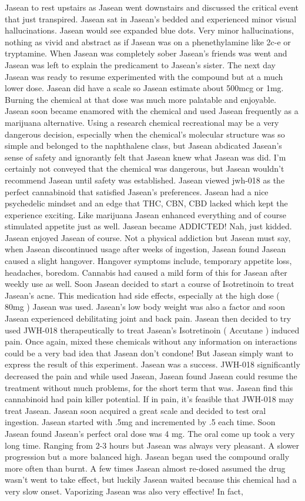 \documentclass[12pt]{book}
\begin{document}
Jasean to rest upstairs as Jasean went downstairs and discussed the critical event that just transpired. Jasean sat in Jasean's bedded and experienced minor visual hallucinations. Jasean would see expanded blue dots. Very minor hallucinations, nothing as vivid and abstract as if Jasean was on a phenethylamine like 2c-e or tryptamine. When Jasean was completely sober Jasean's friends was went and Jasean was left to explain the predicament to Jasean's sister. The next day Jasean was ready to resume experimented with the compound but at a much lower dose. Jasean did have a scale so Jasean estimate about 500mcg or 1mg. Burning the chemical at that dose was much more palatable and enjoyable. Jasean soon became enamored with the chemical and used Jasean frequently as a marijuana alternative. Using a research chemical recreational may be a very dangerous decision, especially when the chemical's molecular structure was so simple and belonged to the naphthalene class, but Jasean abdicated Jasean's sense of safety and ignorantly felt that Jasean knew what Jasean was did. I'm certainly not conveyed that the chemical was dangerous, but Jasean wouldn't recommend Jasean until safety was established. Jasean viewed jwh-018 as the perfect cannabinoid that satisfied Jasean's preferences. Jasean had a nice psychedelic mindset and an edge that THC, CBN, CBD lacked which kept the experience exciting. Like marijuana Jasean enhanced everything and of course stimulated appetite just as well. Jasean became ADDICTED! Nah, just kidded. Jasean enjoyed Jasean of course. Not a physical addiction but Jasean must say, when Jasean discontinued usage after weeks of ingestion, Jasean found Jasean caused a slight hangover. Hangover symptoms include, temporary appetite loss, headaches, boredom. Cannabis had caused a mild form of this for Jasean after weekly use as well. Soon Jasean decided to start a course of Isotretinoin to treat Jasean's acne. This medication had side effects, especially at the high dose ( 80mg ) Jasean was used. Jasean's low body weight was also a factor and soon Jasean experienced debilitating joint and back pain. Jasean then decided to try used JWH-018 therapeutically to treat Jasean's Isotretinoin ( Accutane ) induced pain. Once again, mixed these chemicals without any information on interactions could be a very bad idea that Jasean don't condone! But Jasean simply want to express the result of this experiment. Jasean was a success. JWH-018 significantly decreased the pain and while used Jasean, Jasean found Jasean could resume the treatment without much problems, for the short term that was. Jasean find this cannabinoid had pain killer potential. If in pain, it's feasible that JWH-018 may treat Jasean. Jasean soon acquired a great scale and decided to test oral ingestion. Jasean started with .5mg and incremented by .5 each time. Soon Jasean found Jasean's perfect oral dose was 4 mg. The oral come up took a very long time. Ranging from 2-3 hours but Jasean was always very pleasant. A slower progression but a more balanced high. Jasean began used the compound orally more often than burnt. A few times Jasean almost re-dosed assumed the drug wasn't went to take effect, but luckily Jasean waited because this chemical had a very slow onset. Vaporizing Jasean was also very effective! In fact, 
\end{document}
